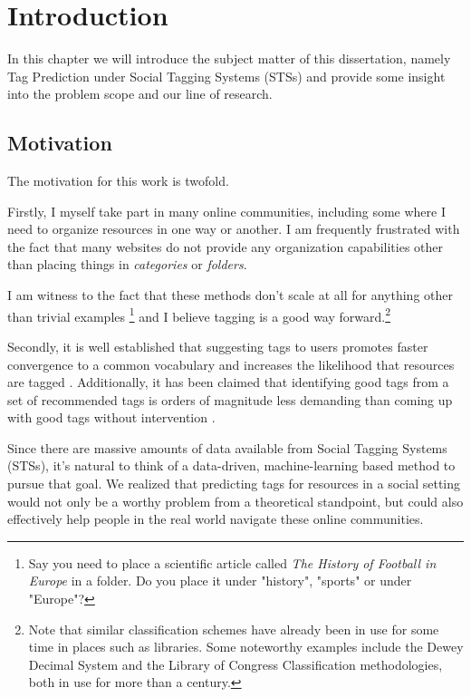 \chapter{Introduction}\label{chap:intro}

In this chapter we will introduce the subject matter of this dissertation, namely Tag Prediction under Social Tagging Systems (STSs) and provide some insight into the problem scope and our line of research.

\section{Motivation}\label{section:intro_motivation}

The motivation for this work is twofold. 

Firstly, I myself take part in many online communities, including some where I need to organize resources in one way or another. I am frequently frustrated with the fact that many websites do not provide any organization capabilities other than placing things in \textit{categories} or \textit{folders}.

I am witness to the fact that these methods don't scale at all for anything other than trivial examples \footnote{Say you need to place a scientific article called \textit{The History of Football in Europe} in a folder. Do you place it under "history", "sports" or under "Europe"?} and I believe tagging is a good way forward.\footnote{Note that similar classification schemes have already been in use for some time in places such as libraries. Some noteworthy examples include the Dewey Decimal System and the Library of Congress Classification methodologies, both in use for more than a century.}

Secondly, it is well established that suggesting tags to users promotes faster convergence to a common vocabulary \citep{marlow_etal_2006,hassan_etal_2009, dattolo_etal_2010} and increases the likelihood that resources are tagged \citep{dattolo_etal_2010,floeck_etal_2010}. Additionally, it has been claimed that identifying good tags from a set of recommended tags is orders of magnitude less demanding than coming up with good tags without intervention \citep{marinho_etal_2012}.

Since there are massive amounts of data available from Social Tagging Systems (STSs), it's natural to think of a data-driven, machine-learning based method to pursue that goal. We realized that predicting tags for resources in a social setting would not only be a worthy problem from a theoretical standpoint, but could also effectively help people in the real world navigate these online communities.

